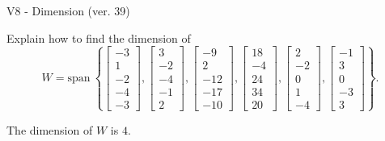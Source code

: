 \begin{exercise}
  \begin{exerciseTitle}V8 - Dimension (ver. 39)\end{exerciseTitle}
  \begin{exerciseStatement}
    Explain how to find the dimension of 
\[W=\mathrm{span}\ \left\{\left[\begin{array}{r}
-3 \\
1 \\
-2 \\
-4 \\
-3
\end{array}\right] , \left[\begin{array}{r}
3 \\
-2 \\
-4 \\
-1 \\
2
\end{array}\right] , \left[\begin{array}{r}
-9 \\
2 \\
-12 \\
-17 \\
-10
\end{array}\right] , \left[\begin{array}{r}
18 \\
-4 \\
24 \\
34 \\
20
\end{array}\right] , \left[\begin{array}{r}
2 \\
-2 \\
0 \\
1 \\
-4
\end{array}\right] , \left[\begin{array}{r}
-1 \\
3 \\
0 \\
-3 \\
3
\end{array}\right]\right\}.\]



  \end{exerciseStatement}
  \begin{exerciseAnswer}
   The dimension of \(W\) is  \(4\).
  


  \end{exerciseAnswer}
\end{exercise}